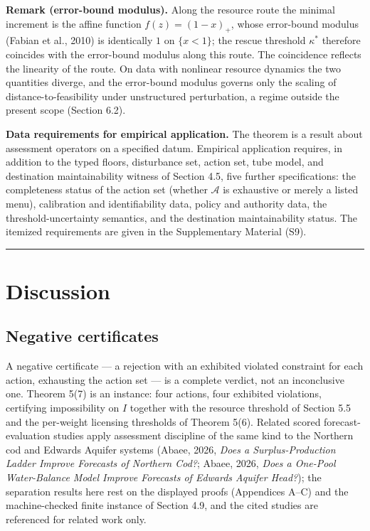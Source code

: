 \documentclass[review,11pt]{elsarticle}
\begin{document}
\textbf{Remark (error-bound modulus).} Along the resource route the minimal increment is the affine function \(f(z) = (1 - x)_+\), whose error-bound modulus (Fabian et al., 2010) is identically \(1\) on \(\{x < 1\}\); the rescue threshold \(\kappa^*\) therefore coincides with the error-bound modulus along this route. The coincidence reflects the linearity of the route. On data with nonlinear resource dynamics the two quantities diverge, and the error-bound modulus governs only the scaling of distance-to-feasibility under unstructured perturbation, a regime outside the present scope (Section 6.2).

\textbf{Data requirements for empirical application.} The theorem is a
result about assessment operators on a specified datum. Empirical
application requires, in addition to the typed floors, disturbance set,
action set, tube model, and destination maintainability witness of
Section 4.5, five further specifications: the completeness status of the
action set (whether \(\mathcal{A}\) is exhaustive or merely a listed
menu), calibration and identifiability data, policy and authority data,
the threshold-uncertainty semantics, and the destination
maintainability status. The itemized requirements are given in the
Supplementary Material (S9).

\begin{center}\rule{0.5\linewidth}{0.5pt}\end{center}

\section{Discussion}\label{discussion}

\subsection{Negative certificates}\label{negative-certificates}

A negative certificate --- a rejection with an exhibited violated constraint for each action, exhausting the action set --- is a complete verdict, not an inconclusive one. Theorem 5(7) is an instance: four actions, four exhibited violations, certifying impossibility on \(I\) together with the resource threshold of Section 5.5 and the per-weight licensing thresholds of Theorem 5(6). Related scored forecast-evaluation studies apply assessment discipline of the same kind to the Northern cod and Edwards Aquifer systems (Abaee, 2026, \emph{Does a Surplus-Production Ladder Improve Forecasts of Northern Cod?}; Abaee, 2026, \emph{Does a One-Pool Water-Balance Model Improve Forecasts of Edwards Aquifer Head?}); the separation results here rest on the displayed proofs (Appendices A--C) and the machine-checked finite instance of Section 4.9, and the cited studies are referenced for related work only.
\end{document}
